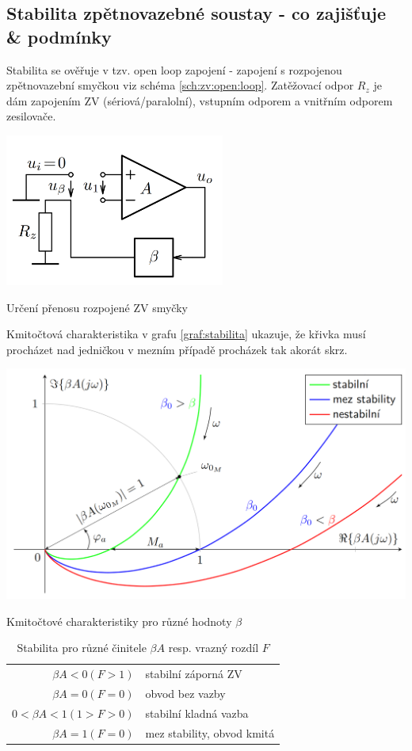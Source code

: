 \documentclass[a4paper,12pt]{article}   %
\begin{document}
\subsection{Stabilita zpětnovazebné soustay - co zajišťuje \& podmínky}
Stabilita se ověřuje v tzv. open loop zapojení - zapojení s rozpojenou zpětnovazební smyčkou viz schéma \ref{sch:zv:open:loop}. Zatěžovací odpor $R_z$ je dám zapojením ZV (sériová/paralolní), vstupním odporem a vnitřním odporem zesilovače.
\begin{schema}
    \centering
    \includegraphics[height=5cm]{ZV-open_loop.PNG}
    \caption{Určení přenosu rozpojené ZV smyčky}
    \label{sch:zv:open:loop}
\end{schema}

Kmitočtová charakteristika v grafu \ref{graf:stabilita} ukazuje, že křivka musí procházet nad jedničkou v mezním případě procházek tak akorát skrz.
\begin{graf}
    \centering
    \includegraphics[width=.6\textwidth]{stabilita_vice.PNG}
    \caption{Kmitočtové charakteristiky pro různé hodnoty $\beta$}
    \label{graf:stabilita}
\end{graf}

\begin{table}
    \centering
    \begin{tabular}{rl}
        $\beta A < 0 (F>1)$ & stabilní záporná ZV\\
        $\beta A = 0 (F=0)$ & obvod bez vazby \\
        $0 < \beta A < 1(1>F>0)$&stabilní kladná vazba\\
        $\beta A = 1 (F=0)$ & mez stability, obvod kmitá\\
    \end{tabular}
    \caption{Stabilita pro různé činitele $\beta A$ resp. vrazný rozdíl $F$}
    \label{tab:stabilita}
\end{table}
\end{document}
